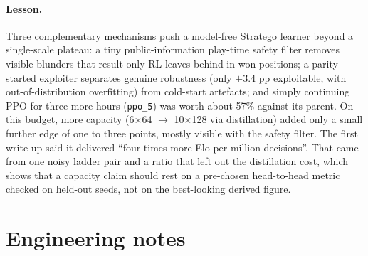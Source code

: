 \paragraph{Lesson.} Three complementary mechanisms push a model-free Stratego learner beyond a
single-scale plateau: a tiny public-information play-time safety filter removes visible blunders
that result-only RL leaves behind in won positions; a parity-started exploiter separates genuine
robustness (only $+3.4$ pp exploitable, with out-of-distribution overfitting) from cold-start
artefacts; and simply continuing PPO for three more hours (\texttt{ppo\_5}) was worth about 57\%
against its parent. On this budget, more capacity (6$\times$64 $\to$ 10$\times$128 via
distillation) added only a small further edge of one to three points, mostly visible with the
safety filter. The first write-up said it delivered ``four times more Elo per million
decisions''. That came from one noisy ladder pair and a ratio that left out the distillation
cost, which shows that a capacity claim should rest on a pre-chosen head-to-head metric checked
on held-out seeds, not on the best-looking derived figure.

\section{Engineering notes}
\label{sec:engineering}


